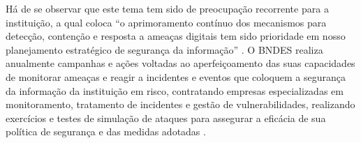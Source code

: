 Há de se observar que este tema tem sido de preocupação recorrente para a instituição, a qual coloca ``o aprimoramento contínuo dos
mecanismos para detecção, contenção e resposta a ameaças digitais tem sido prioridade em nosso planejamento estratégico de segurança da informação'' \cite{bndes_ra2025}. O BNDES realiza anualmente campanhas e ações voltadas ao aperfeiçoamento das suas capacidades de monitorar ameaças e reagir a incidentes e eventos que coloquem a segurança da informação da instituição em risco, contratando empresas especializadas em monitoramento, tratamento de incidentes e gestão de vulnerabilidades, realizando exercícios e testes de simulação de ataques para assegurar a eficácia de sua política de segurança e das medidas adotadas \cite{bndes_ra2022,bndes_ra2024,bndes_ra2025}.